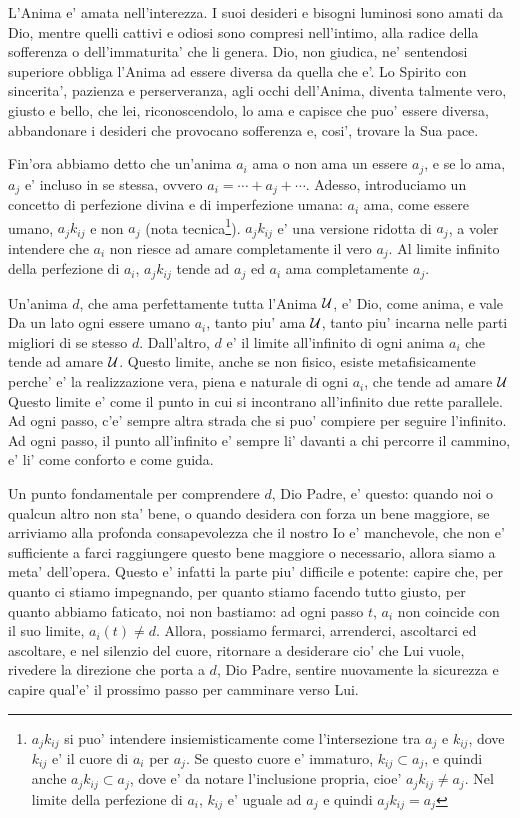 L'Anima e' amata nell'interezza. I suoi desideri e bisogni luminosi sono amati da Dio, mentre quelli cattivi e odiosi sono compresi nell'intimo, alla radice della sofferenza o dell'immaturita' che li genera. Dio, non giudica, ne' sentendosi superiore obbliga l'Anima ad essere diversa da quella che e'. Lo Spirito con sincerita', pazienza e perserveranza, agli occhi dell'Anima, diventa talmente vero, giusto e bello, che lei, riconoscendolo, lo ama e capisce che puo' essere diversa, abbandonare i desideri che provocano sofferenza e, cosi', trovare la Sua pace.

Fin'ora abbiamo detto che un'anima $a_i$ ama o non ama un essere $a_j$, e se lo ama, $a_j$ e' incluso in se stessa, ovvero $a_i=\cdots+a_j+\cdots$. Adesso, introduciamo un concetto di perfezione divina e di imperfezione umana: $a_i$ ama, come essere umano, $a_jk_{ij}$ e non $a_j$ (nota tecnica\footnote{$a_jk_{ij}$ si puo' intendere insiemisticamente come l'intersezione tra $a_j$ e $k_{ij}$, dove $k_{ij}$ e' il cuore di $a_i$ per $a_j$. Se questo cuore e' immaturo, $k_{ij} \subset a_j$, e quindi anche $a_jk_{ij}\subset a_j$, dove e' da notare l'inclusione propria, cioe' $a_jk_{ij}\ne a_j$. Nel limite della perfezione di $a_i$, $k_{ij}$ e' uguale ad $a_j$ e quindi $a_jk_{ij}=a_j$}). $a_jk_{ij}$ e' una versione ridotta di $a_j$, a voler intendere che $a_i$ non riesce ad amare completamente il vero $a_j$. Al limite infinito della perfezione di $a_i$, $a_jk_{ij}$ tende ad $a_j$ ed $a_i$ ama completamente $a_j$.

Un'anima $d$, che ama perfettamente tutta l'Anima $\mathcal{U}$, e' Dio, come anima, e vale 
Da un lato ogni essere umano $a_i$, tanto piu' ama $\mathcal{U}$, tanto piu' incarna nelle parti migliori di se stesso $d$. Dall'altro, $d$ e' il limite all'infinito di ogni anima $a_i$ che tende ad amare $\mathcal{U}$. Questo limite, anche se non fisico, esiste metafisicamente perche' e' la realizzazione vera, piena e naturale di ogni $a_i$, che tende ad amare $\mathcal{U}$
Questo limite e' come il punto in cui si incontrano all'infinito due rette parallele. Ad ogni passo, c'e' sempre altra strada che si puo' compiere per seguire l'infinito. Ad ogni passo, il punto all'infinito e' sempre li' davanti a chi percorre il cammino, e' li' come conforto e come guida.

Un punto fondamentale per comprendere $d$, Dio Padre, e' questo: quando noi o qualcun altro non sta' bene, o quando desidera con forza un bene maggiore, se arriviamo alla profonda consapevolezza che il nostro Io e' manchevole, che non e' sufficiente a farci raggiungere questo bene maggiore o necessario, allora siamo a meta' dell'opera. Questo e' infatti la parte piu' difficile e potente: capire che, per quanto ci stiamo impegnando, per quanto stiamo facendo tutto giusto, per quanto abbiamo faticato, noi non bastiamo: ad ogni passo $t$, $a_i$ non coincide con il suo limite, $a_i(t) \ne d$. Allora, possiamo fermarci, arrenderci, ascoltarci ed ascoltare, e nel silenzio del cuore, ritornare a desiderare cio' che Lui vuole, rivedere la direzione che porta a $d$, Dio Padre, sentire nuovamente la sicurezza e capire qual'e' il prossimo passo per camminare verso Lui.

